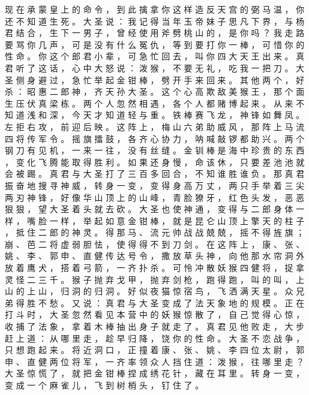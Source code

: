 {现 在 承 蒙 皇 上 的 命 令 ， 到 此 擒 拿 你 这 样 造 反 天 宫 的 弼 马 温 ， 你 还 不 知 道 生 死 。
大 圣 说 ： 我 记 得 当 年 玉 帝 妹 子 思 凡 下 界 ， 与 杨 君 结 合 ， 生 下 一 男 子 ， 曾 经 使 用 斧 劈 桃 山 的 ， 是 你 吗 ？ 我 走 路 要 骂 你 几 声 ， 可 是 没 有 什 么 冤 仇 ， 等 到 要 打 你 一 棒 ， 可 惜 你 的 性 命 。
你 这 个 郎 君 小 辈 ， 可 急 忙 回 去 ， 叫 你 四 大 天 王 出 来 。
真 君 听 了 这 话 ， 心 中 大 怒 说 ： 泼 猴 ， 不 要 无 礼 ， 吃 我 一 把 刀 。
大 圣 侧 身 避 过 ， 急 忙 举 起 金 钳 棒 ， 劈 开 手 来 回 来 。
其 他 两 个 ， 好 杀 ： 昭 惠 二 郎 神 ， 齐 天 孙 大 圣 。
这 个 心 高 欺 敌 美 猴 王 ， 那 个 面 生 压 伏 真 梁 栋 。
两 个 人 忽 然 相 遇 ， 各 个 人 都 赌 博 起 来 。
从 来 不 知 道 浅 和 深 ， 今 天 才 知 道 轻 与 重 。
铁 棒 赛 飞 龙 ， 神 锋 如 舞 凤 。
左 拒 右 攻 ， 前 迎 后 映 。
这 阵 上 ， 梅 山 六 弟 助 威 风 ， 那 阵 上 马 流 四 将 传 军 令 。
摇 旗 擂 鼓 ， 各 齐 心 协 力 ， 呐 喊 敲 锣 都 助 兴 。
两 个 钢 刀 有 见 机 ， 一 来 一 往 ， 没 有 丝 缝 。
金 钏 棒 是 海 中 珍 贵 的 东 西 ， 变 化 飞 腾 能 取 得 胜 利 。
如 果 还 身 慢 ， 命 该 休 ， 只 要 差 池 池 就 会 被 踢 。
真 君 与 大 圣 打 了 三 百 多 回 合 ， 不 知 谁 胜 谁 负 。
那 真 君 振 奋 地 搜 寻 神 威 ， 转 身 一 变 ， 变 得 身 高 万 丈 ， 两 只 手 举 着 三 尖 两 刃 神 锋 ， 好 像 华 山 顶 上 的 山 峰 ， 青 脸 獠 牙 ， 红 色 头 发 ， 恶 恶 狠 狠 ， 望 大 圣 着 头 就 去 砍 。
大 圣 也 使 神 通 ， 变 得 与 二 郎 身 体 一 样 ， 嘴 脸 一 样 ， 举 起 如 意 金 钳 棒 ， 就 是 昆 仑 山 顶 上 擎 天 的 柱 子 ， 抵 住 二 郎 的 神 灵 。
得 那 马 、 流 元 帅 战 战 兢 兢 ， 摇 不 得 旌 旗 ； 崩 、 芭 二 将 虚 弱 胆 怯 ， 使 得 得 不 到 刀 剑 。
在 这 阵 上 ， 康 、 张 、 姚 、 李 、 郭 申 、 直 健 传 达 号 令 ， 撒 放 草 头 神 ， 向 他 那 水 帘 洞 外 放 着 鹰 犬 ， 搭 着 弓 箭 ， 一 齐 扑 杀 。
可 怜 冲 散 妖 猴 四 健 将 ， 捉 拿 灵 怪 二 三 千 。
猴 子 抛 弃 戈 甲 ， 抛 弃 剑 枪 ， 跑 得 跑 ， 叫 的 叫 ， 上 山 的 上 山 ， 归 洞 的 归 洞 。
好 似 夜 猫 惊 宿 鸟 ， 飞 洒 满 天 星 。
众 兄 弟 得 胜 不 愁 。
又 说 ： 真 君 与 大 圣 变 成 了 法 天 象 地 的 规 模 。 正 在 打 斗 时 ， 大 圣 忽 然 看 见 本 营 中 的 妖 猴 惊 散 了 ， 自 己 觉 得 心 惊 ， 收 捕 了 法 象 ， 拿 着 木 棒 抽 出 身 子 就 走 了 。
真 君 见 他 败 走 ， 大 步 赶 上 道 ： 从 哪 里 走 ， 趁 早 归 降 ， 饶 你 的 性 命 。
大 圣 不 恋 战 争 ， 只 想 跑 起 来 。
将 近 洞 口 ， 正 撞 着 康 、 张 、 姚 、 李 四 位 太 尉 ， 郭 申 、 直 健 两 位 将 军 ， 一 齐 率 领 众 人 挡 住 道 ： 泼 猴 ， 往 哪 里 走 ？ 大 圣 惊 慌 了 ， 就 把 金 钳 棒 捏 成 绣 花 针 ， 藏 在 耳 里 。
转 身 一 变 ， 变 成 一 个 麻 雀 儿 ， 飞 到 树 梢 头 ， 钉 住 了 。
}
